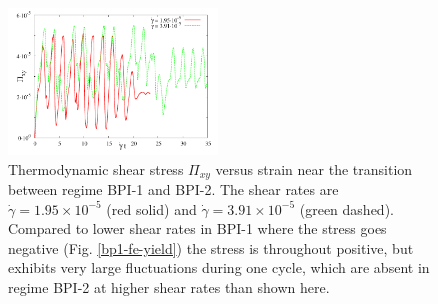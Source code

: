 \documentclass[8.5pt,twoside,twocolumn]{article}
\newcommand{\e}[1]{\times10^{#1}}
\newcommand{\gd}{\dot{\gamma}}
\begin{document}
\begin{figure}[htpb]
\includegraphics[width=0.495\textwidth]{stress_bp1-1_bp1-2.pdf}
\caption{Thermodynamic shear stress $\Pi_{xy}$ versus strain near the transition between regime
BPI-1 and BPI-2. The shear rates are $\gd=1.95\e{-5}$ (red solid) 
and $\gd=3.91\e{-5}$ (green dashed). Compared to lower shear rates in BPI-1 
where the stress goes negative (Fig. \ref{bp1-fe-yield}) the stress is 
throughout positive, but exhibits very large fluctuations during one cycle, 
which are absent in regime BPI-2 at higher shear rates than shown here.}
\label{bp1-1_bp1-2}
\end{figure}
\end{document}
